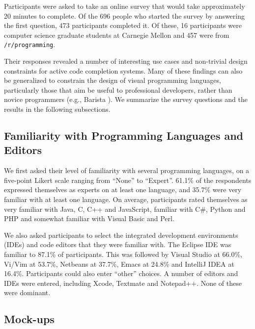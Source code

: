 \documentclass[conference]{IEEEtran}
\begin{document}
Participants were asked to take an online survey that would take approximately 20 minutes to complete. Of the 696 people who started the survey by answering the first question, 473 participants completed it. Of these, 16 participants were computer science graduate students at Carnegie Mellon and 457 were from \texttt{/r/programming}.

Their responses revealed a number of interesting use cases and non-trivial design constraints for active code completion systems. Many of these findings can also be generalized to constrain the design of visual programming languages, particularly those that aim be useful to professional developers, rather than novice programmers (e.g., Barista \cite{ko_barista:_2006}). We summarize the survey questions and the results in the following subsections.

\subsection{Familiarity with Programming Languages and Editors}

We first asked their level of familiarity with several programming languages, on a five-point Likert scale ranging from ``None'' to ``Expert''. 61.1\% of the respondents expressed themselves as experts on at least one language, and 35.7\% were very familiar with at least one language. On average, participants rated themselves as very familiar with Java, C, C++ and JavaScript, familiar with C\#, Python and PHP and somewhat familiar with Visual Basic and Perl.

We also asked participants to select the integrated development environments (IDEs) and code editors that they were familiar with. The Eclipse IDE was familiar to 87.1\% of participants. This was followed by Visual Studio at 66.0\%, Vi/Vim at 53.7\%, Netbeans at 37.7\%, Emacs at 24.8\% and IntelliJ IDEA at 16.4\%. Participants could also enter ``other'' choices. A number of editors and IDEs were entered, including Xcode, Textmate and Notepad++. None of these were dominant.

\subsection{Mock-ups}
\end{document}
